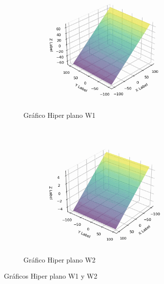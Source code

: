 \documentclass[12 pt]{article}
\begin{document}
\begin{enumerate}
\begin{figure}[H]
    \centering
    \begin{subfigure}[b]{0.45\linewidth}
        \centering
        \includegraphics[width=\linewidth]{img/w1.png}
        \caption{Gráfico Hiper plano W1}
        \label{fig:w1}
    \end{subfigure}
    \hfill
    \begin{subfigure}[b]{0.45\linewidth}
        \centering
        \includegraphics[width=\linewidth]{img/w2.png}
        \caption{Gráfico Hiper plano W2}
        \label{fig:w2}
    \end{subfigure}
    \caption{Gráficos Hiper plano W1 y W2}
    \label{fig:planos}
\end{figure}

\end{enumerate}
\end{document}
